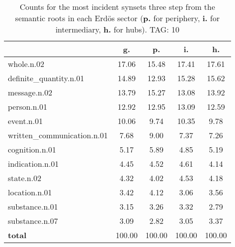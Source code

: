 \begin{table}[h!]
\begin{center}
\begin{tabular}{| l | c | c | c | c |}\hline
 & g. & p. & i. & h. \\\hline
whole.n.02 & 17.06  & 15.48  & 17.41  & 17.61 \\\hline
definite\_quantity.n.01 & 14.89  & 12.93  & 15.28  & 15.62 \\\hline
message.n.02 & 13.79  & 15.27  & 13.08  & 13.92 \\\hline
person.n.01 & 12.92  & 12.95  & 13.09  & 12.59 \\\hline
event.n.01 & 10.06  & 9.74  & 10.35  & 9.78 \\\hline
written\_communication.n.01 & 7.68  & 9.00  & 7.37  & 7.26 \\\hline
cognition.n.01 & 5.17  & 5.89  & 4.85  & 5.19 \\\hline
indication.n.01 & 4.45  & 4.52  & 4.61  & 4.14 \\\hline
state.n.02 & 4.32  & 4.02  & 4.53  & 4.18 \\\hline
location.n.01 & 3.42  & 4.12  & 3.06  & 3.56 \\\hline
substance.n.01 & 3.15  & 3.26  & 3.32  & 2.79 \\\hline
substance.n.07 & 3.09  & 2.82  & 3.05  & 3.37 \\\hline
{{\bf total}} & 100.00  & 100.00  & 100.00  & 100.00 \\\hline
\end{tabular}
\caption{Counts for the most incident synsets three step from the semantic roots in each Erd\"os sector ({\bf p.} for periphery, {\bf i.} for intermediary, {\bf h.} for hubs). TAG: 10}
\end{center}
\end{table}